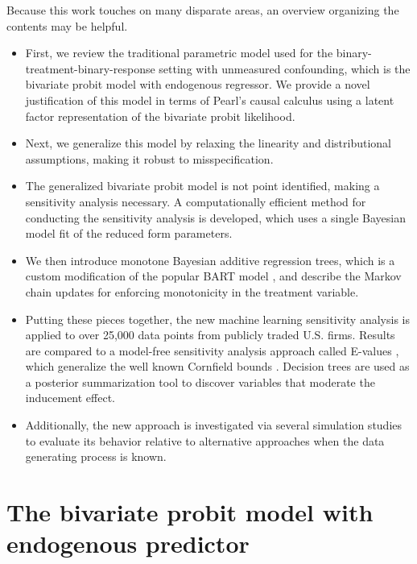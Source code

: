 \documentclass[aoas,preprint, 11pt, dvipsnames, table, x11name]{imsart}
\theoremstyle{remark}
\begin{document}
	Because this work touches on many disparate areas, an overview organizing the contents may be helpful.
	\begin{itemize}
		\item First, we review the traditional parametric model used for the binary-treatment-binary-response setting with unmeasured confounding, which is the bivariate probit model with endogenous regressor. We provide a novel justification of this model in terms of Pearl's causal calculus using a latent factor representation of the bivariate probit likelihood. 
		\item Next, we generalize this model by relaxing the linearity and distributional assumptions, making it robust to misspecification.
		\item The generalized bivariate probit model is not point identified, making a sensitivity analysis necessary. A computationally efficient method for conducting the sensitivity analysis is developed, which uses a single Bayesian model fit of the reduced form parameters.
		\item We then introduce monotone Bayesian additive regression trees, which is a custom modification of the popular BART model \citep{bart}, and describe the Markov chain updates for enforcing monotonicity in the treatment variable.
		\item Putting these pieces together, the new machine learning sensitivity analysis is applied to over 25,000 data points from publicly traded U.S. firms. Results are compared to a model-free sensitivity analysis approach called E-values \citep{Peng-2016}, which generalize the well known Cornfield bounds \citep{Cornfield}. Decision trees are used as a posterior summarization tool to discover variables that moderate the inducement effect.  
		\item Additionally, the new approach is investigated via several simulation studies to evaluate its behavior relative to alternative approaches when the data generating process is known.
	\end{itemize}
	
	\section{The bivariate probit model with endogenous predictor}
	
\end{document}

